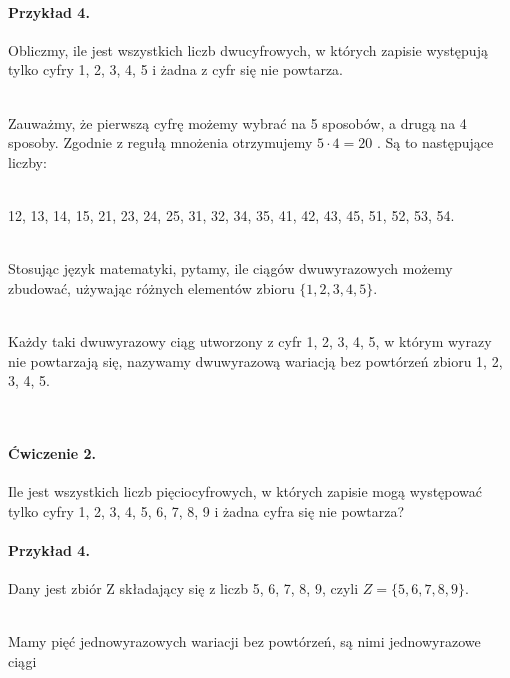 \documentclass[polish,10pt]{article}
\begin{document}
\paragraph{Przykład 4.}
Obliczmy, ile jest wszystkich liczb dwucyfrowych, w których zapisie występują tylko cyfry 1, 2, 3, 4, 5 i żadna z cyfr się nie powtarza.

\hspace{1cm}\\Zauważmy, że pierwszą cyfrę możemy wybrać na 5 sposobów, a drugą na 4 sposoby. Zgodnie z regułą mnożenia otrzymujemy $5\cdot4=20$ . Są to następujące liczby:

\hspace{1cm}\\12, 13, 14, 15, 21, 23, 24, 25, 31, 32, 34, 35, 41, 42, 43, 45, 51, 52, 53, 54.

\hspace{1cm}\\Stosując język matematyki, pytamy, ile ciągów dwuwyrazowych możemy zbudować, używając różnych elementów zbioru $\{1, 2, 3, 4, 5\}$.

\hspace{1cm}\\Każdy taki dwuwyrazowy ciąg utworzony z cyfr 1, 2, 3, 4, 5, w którym wyrazy nie powtarzają się, nazywamy dwuwyrazową wariacją bez powtórzeń zbioru {1, 2, 3, 4, 5}.

\hspace{1cm}\\\noindent{}
\paragraph{Ćwiczenie 2.}
Ile jest wszystkich liczb pięciocyfrowych, w których zapisie mogą występować tylko cyfry 1, 2, 3, 4, 5, 6, 7, 8, 9 i żadna cyfra się nie powtarza?

\paragraph{Przykład 4.}
Dany jest zbiór Z składający się z liczb 5, 6, 7, 8, 9, czyli $Z =\{5, 6, 7, 8, 9\}$.

\hspace{1cm}\\Mamy pięć jednowyrazowych wariacji bez powtórzeń, są nimi jednowyrazowe ciągi
\end{document}
